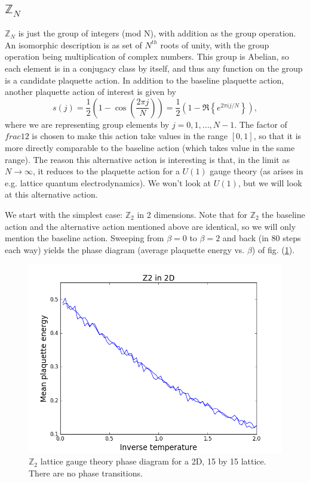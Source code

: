 \documentclass[9pt,twocolumn,twoside]{article}
\begin{document}
\subsection{$\mathbb{Z}_N$}
$\mathbb{Z}_N$ is just the group of integers (mod N), with addition as the group operation.  An isomorphic description is as set of $N^{th}$ roots of unity, with the group operation being multiplication of complex numbers.  This group is Abelian, so each element is in a conjugacy class by itself, and thus any function on the group is a candidate plaquette action.  In addition to the baseline plaquette action, another plaquette action of interest is given by 
\[s(j) = \frac{1}{2}\left(1-\cos\left(\frac{2\pi j}{N}\right)\right) = \frac{1}{2}\left(1 - \Re{\left\{ e^{2\pi i j/N} \right\}}\right),\]
where we are representing group elements by $j=0,1,...,N-1$.  The factor of $frac{1}{2}$ is chosen to make this action take values in the range $[0,1]$, so that it is more directly comparable to the baseline action (which takes value in the same range).  The reason this alternative action is interesting is that, in the limit as $N\rightarrow \infty$, it reduces to the plaquette action for a $U(1)$ gauge theory (as arises in e.g. lattice quantum electrodynamics).  We won't look at $U(1)$, but we will look at this alternative action.  

We start with the simplest case: $\mathbb{Z}_2$ in 2 dimensions.  Note that for $\mathbb{Z}_2$ the baseline action and the alternative action mentioned above are identical, so we will only mention the baseline action.  Sweeping from $\beta=0$ to $\beta=2$ and back (in 80 steps each way) yields the phase diagram (average plaquette energy vs. $\beta$) of fig. (\ref{z2,2d}).
\begin{figure}[h!]
	\begin{centering}
	\includegraphics[width=\columnwidth]{z2,2d}
	\caption[$\mathbb{Z}_2$ lattice gauge theory phase diagram for a 2D lattice.]{$\mathbb{Z}_2$ lattice gauge theory phase diagram for a 2D, 15 by 15 lattice.  There are no phase transitions.}
	\label{z2,2d}
	\end{centering}
\end{figure}
\end{document}
